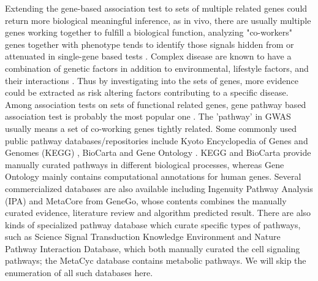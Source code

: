 \documentclass[12pt]{article}
\begin{document}
Extending the gene-based association test to sets of multiple related genes could return more biological meaningful inference, as in vivo, there are usually multiple genes working together to fulfill a biological function, analyzing "co-workers" genes together with phenotype tends to identify those signals hidden from or attenuated in single-gene based tests \cite{BloodPressureGenome-WideAssociationStudies2011,Hirschhorn2009,Zhong2010,Wang2010}. Complex disease are known to have a combination of genetic factors in addition to environmental, lifestyle factors, and their interactions \cite{Hirschhorn2005,McCarthy2008}. Thus by investigating into the sets of genes, more evidence could be extracted as risk altering factors contributing to a specific disease. Among association tests on sets of functional related genes, gene pathway based association test is probably the most popular one \cite{DelaCruz2010,Wang2010}. The 'pathway' in GWAS usually means a set of co-working genes tightly related. Some commonly used public pathway databases/repositories include Kyoto Encyclopedia of Genes and Genomes (KEGG) \cite{Ogata1999}, BioCarta \cite{Nishimura2001} and Gene Ontology \cite{Ashburner2000}. KEGG and BioCarta provide manually curated pathways in different biological processes, whereas Gene Ontology mainly contains computational annotations for human genes. Several commercialized databases are also available including Ingenuity Pathway Analysis (IPA) and MetaCore from GeneGo, whose contents combines the manually curated evidence, literature review and algorithm predicted result. There are also kinds of specialized pathway database which curate specific types of pathways, such as Science Signal Transduction Knowledge Environment and Nature Pathway Interaction Database, which both manually curated the cell signaling pathways; the MetaCyc database contains metabolic pathways. We will skip the enumeration of all such databases here. 
\end{document}
